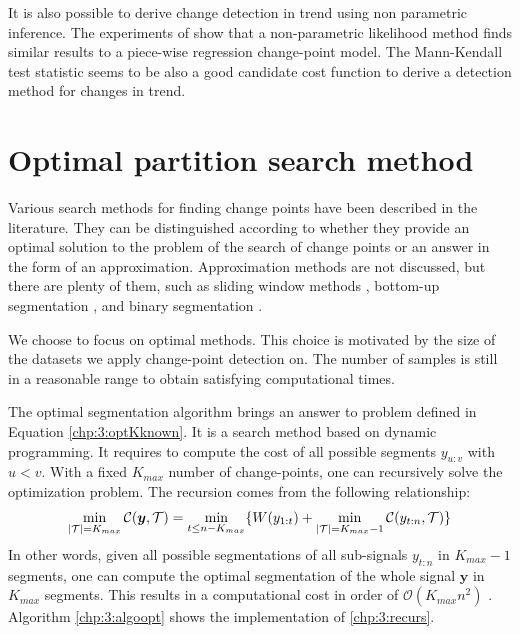 It is also possible to derive change detection in trend using non parametric inference. The experiments of \cite{Haynes2016} show that a non-parametric likelihood method finds similar results to a piece-wise regression change-point model. The Mann-Kendall test statistic \citep{Pohlert2020,1994a} seems to be also a good candidate cost function to derive a detection method for changes in trend.  


\section{Optimal partition search method}\label{chp:3:2}

Various search methods for finding change points have been described in the literature. They can be distinguished according to whether they provide an optimal solution to the problem of the search of change points or an answer in the form of an approximation. Approximation methods are not discussed, but there are plenty of them, such as sliding window methods \citep{Li2010,Liu2022}, bottom-up segmentation \citep{chen1998speaker}, and binary segmentation \citep{Yang2001,Fryzlewicz2014}. 

We choose to focus on optimal methods. This choice is motivated by the size of the datasets we apply change-point detection on. The number of samples is still in a reasonable range to obtain satisfying computational times.  

The optimal segmentation algorithm brings an answer to problem defined in Equation \ref{chp:3:optKknown}. It is a search method based on dynamic programming. It requires to compute the cost of all possible segments $y_{u:v}$ with $u<v$.  With a fixed $K_{max}$ number of change-points, one can recursively solve the optimization problem. The recursion comes from the following relationship: 
\begin{equation}\label{chp:3:recurs}
\min_{\lvert{\mathcal T}\rvert = K_{max}}\mathcal{C}(\bm y, {\mathcal T}) = \min_{t \leq n-K_{max}}\{W(y_{1:t})+\min_{\lvert{\mathcal T}\rvert = K_{max}-1}\mathcal{C}(y_{t:n},{\mathcal T})\} 
\end{equation}
In other words, given all possible segmentations of all sub-signals $y_{t:n}$ in $K_{max}-1$ segments, one can compute the optimal segmentation of the whole signal $\bm y$ in $K_{max}$ segments. This results in a computational cost in order of $\mathcal{O}(K_{max}n^2)$ \citep{haynes2017}. Algorithm \ref{chp:3:algoopt} shows the implementation of \ref{chp:3:recurs}. 

